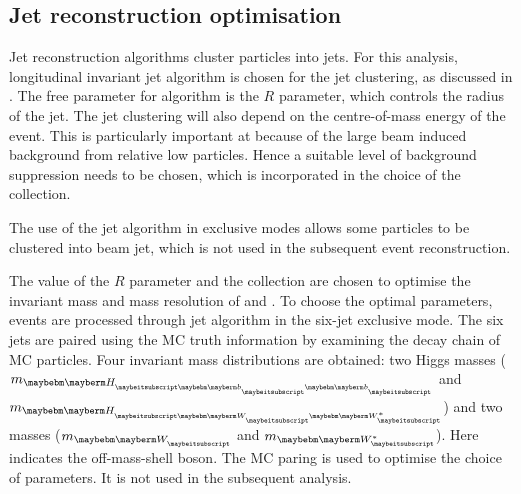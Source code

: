 \subsection{Jet reconstruction optimisation}
\label{sec:doubleHiggsJetOptimisation}

Jet reconstruction algorithms cluster particles into jets. For this analysis, longitudinal invariant \kt jet algorithm is chosen for the jet clustering, as discussed in . The free parameter for \kt algorithm is the $R$ parameter, which controls the radius of the jet. The jet clustering will also depend on the centre-of-mass energy of the event. This is particularly important at \CLIC because of the large beam induced background from relative low  \pT particles. Hence a suitable level of background suppression needs to be chosen, which is incorporated in the choice of the \PFO  collection.


The use of the \kt jet algorithm in exclusive modes allows some particles to be clustered into beam jet, which is not used in the subsequent event reconstruction.

The value of the $R$ parameter and the \PFO collection are chosen to optimise the invariant mass and mass resolution of \PHiggs and \PW. To choose the optimal parameters, \eeToHHbbWWHad events  are processed through \kt jet algorithm  in the six-jet exclusive mode. The six jets are paired using the MC truth information by examining the decay chain of MC particles. Four invariant mass distributions are obtained: two Higgs masses ($m_{\Hbb}$ and $m_{\HWW}$) and two \PW masses ($m_{\PW}$ and $m_{\W*}$). Here \W* indicates the off-mass-shell \PW boson. The MC paring is used to optimise the choice of parameters. It is not used in the subsequent analysis.



